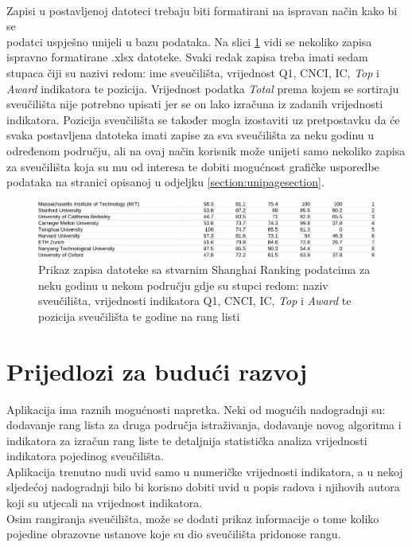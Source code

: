 \documentclass[times, utf8, zavrsni]{fer}
\begin{document}
\\Zapisi u postavljenoj datoteci trebaju biti formatirani na ispravan način kako bi se \\podatci uspješno unijeli u bazu podataka. 
Na slici \ref{fig:real} vidi se nekoliko zapisa ispravno formatirane .xlsx datoteke. Svaki redak zapisa treba imati sedam stupaca čiji su nazivi redom:
ime sveučilišta, vrijednost Q1, CNCI, IC, \emph{Top} i \emph{Award} indikatora te pozicija. Vrijednost podatka \emph{Total} prema kojem se sortiraju 
sveučilišta nije potrebno upisati jer se on lako izračuna iz zadanih vrijednosti indikatora. Pozicija sveučilišta se također mogla
izostaviti uz pretpostavku da će svaka postavljena datoteka imati zapise za sva sveučilišta za neku godinu u određenom području, ali
na ovaj način korisnik može unijeti samo nekoliko zapisa za sveučilišta koja su mu od interesa te dobiti mogućnost 
grafičke usporedbe podataka na stranici opisanoj u odjeljku \ref{section:unipagesection}.
\begin{figure}[htb]
    \hspace{-1.2cm} 
       \includegraphics[scale=0.3]{real.png} 
       \caption{Prikaz zapisa datoteke sa stvarnim Shanghai Ranking podatcima za neku godinu u nekom području gdje su stupci redom: naziv sveučilišta, vrijednosti indikatora Q1, CNCI, IC, \emph{Top} i \emph{Award} te pozicija
       sveučilišta te godine na rang listi}
       \label{fig:real}
       \end{figure}  
\chapter{Prijedlozi za budući razvoj}
Aplikacija ima raznih mogućnosti napretka. Neki od mogućih nadogradnji su: dodavanje rang lista za druga područja istraživanja, 
dodavanje novog algoritma i indikatora za izračun rang liste te detaljnija 
statistička analiza vrijednosti indikatora pojedinog sveučilišta. 
\\Aplikacija trenutno nudi uvid samo u numeričke vrijednosti indikatora, a u nekoj sljedećoj nadogradnji bilo bi korisno dobiti uvid u popis radova i njihovih autora koji su utjecali na 
vrijednost indikatora. 
\\Osim rangiranja sveučilišta, može se dodati prikaz informacije o tome koliko pojedine obrazovne ustanove koje su dio sveučilišta pridonose rangu.
\end{document}
